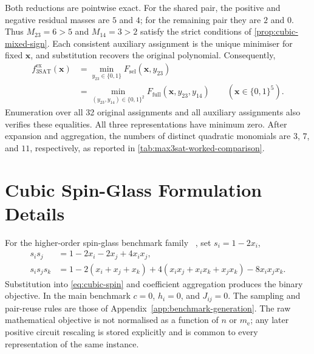 \documentclass[a4paper,onecolumn,11pt,unpublished]{quantumarticle}
\newcommand{\bits}{\{0,1\}}
\theoremstyle{remark}
\begin{document}
Both reductions are pointwise exact. For the shared pair, the positive and
negative residual masses are $5$ and $4$; for the remaining pair they are $2$
and $0$. Thus $M_{23}=6>5$ and $M_{14}=3>2$ satisfy the strict conditions of
\cref{prop:cubic-mixed-sign}. Each consistent auxiliary assignment is the
unique minimiser for fixed $\bm x$, and substitution recovers the original
polynomial. Consequently,
\begin{equation}
\begin{split}
 f_{\mathrm{3SAT}}^{\mathrm{ex}}(\bm x)
 &=\min_{y_{23}\in\bits}F_{\mathrm{sel}}(\bm x,y_{23})\\
 &=\min_{(y_{23},y_{14})\in\bits^2}F_{\mathrm{full}}(\bm x,y_{23},y_{14})
 \qquad (\bm x\in\bits^5).
\end{split}
\label{eq:max3sat-worked-verification}
\end{equation}
Enumeration over all 32 original assignments and all auxiliary assignments
also verifies these equalities. All three representations have minimum zero.
After expansion and aggregation, the numbers of distinct quadratic monomials
are $3$, $7$, and $11$, respectively, as reported in
\cref{tab:max3sat-worked-comparison}.

\section{Cubic Spin-Glass Formulation Details}
\label{app:spin-glass}

For the higher-order spin-glass benchmark family
~\cite{Basso2022,PelofskeShortDepth2024,Pelofske2024}, set $s_i=1-2x_i$,
\begin{align}
    s_is_j&=1-2x_i-2x_j+4x_ix_j,\\
    s_is_js_k&=1-2(x_i+x_j+x_k)
      +4(x_ix_j+x_ix_k+x_jx_k)-8x_ix_jx_k.
\end{align}
Substitution into \cref{eq:cubic-spin} and coefficient aggregation produces the
binary objective.  In the main benchmark $c=0$, $h_i=0$, and $J_{ij}=0$.
The sampling and pair-reuse rules are those of
Appendix~\ref{app:benchmark-generation}.  The raw mathematical
objective is not normalised as a function of $n$ or $m_{\mathrm e}$; any later
positive circuit rescaling is stored explicitly and is common to every
representation of the same instance.



\end{document}
